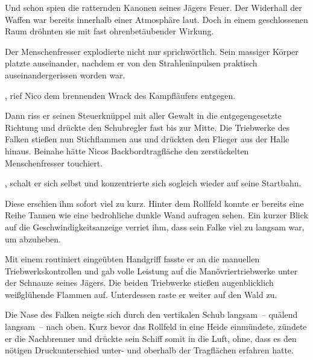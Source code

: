 \par

Und schon spien die ratternden Kanonen seines Jägers Feuer. Der Widerhall der Waffen war bereits innerhalb einer Atmosphäre laut. Doch in einem geschlossenen Raum dröhnten sie mit fast ohrenbetäubender Wirkung.

\par

Der Menschenfresser explodierte nicht nur sprichwörtlich. Sein massiger Körper platzte auseinander, nachdem er von den Strahleninpulsen praktisch auseinandergerissen worden war.

\par

, rief Nico dem brennenden Wrack des Kampfläufers entgegen.

\par

Dann riss er seinen Steuerknüppel mit aller Gewalt in die entgegengesetzte Richtung und drückte den Schubregler fast bis zur Mitte. Die Triebwerke des Falken stießen nun Stichflammen aus und drückten den Flieger aus der Halle hinaus. Beinahe hätte Nicos Backbordtragfläche den zerstückelten Menschenfresser touchiert.

\par

, schalt er sich selbst und konzentrierte sich sogleich wieder auf seine Startbahn.

\par

Diese erschien ihm sofort viel zu kurz. Hinter dem Rollfeld konnte er bereits eine Reihe Tannen wie eine bedrohliche dunkle Wand aufragen sehen. Ein kurzer Blick auf die Geschwindigkeitsanzeige verriet ihm, dass sein Falke viel zu langsam war, um abzuheben.

\par

Mit einem routiniert eingeübten Handgriff fasste er an die manuellen Triebwerkskontrollen und gab volle Leistung auf die Manövriertriebwerke unter der Schnauze seines Jägers. Die beiden Triebwerke stießen augenblicklich weißglühende Flammen auf. Unterdessen raste er weiter auf den Wald zu.

\par

Die Nase des Falken neigte sich durch den vertikalen Schub langsam~-- quälend langsam~-- nach oben. Kurz bevor das Rollfeld in eine Heide einmündete, zündete er die Nachbrenner und drückte sein Schiff somit in die Luft, ohne, dass es den nötigen Druckunterschied unter- und oberhalb der Tragflächen erfahren hatte.

